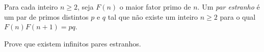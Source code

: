 Para cada inteiro $n \geq 2$,  seja $F(n)$ o maior fator primo de $n$. Um \emph{par estranho} é um par de primos distintos $p$ e $q$ tal que não existe um inteiro $n \geq 2$ para o qual $F(n)F(n+1)=pq$.

Prove que existem infinitos pares estranhos.
